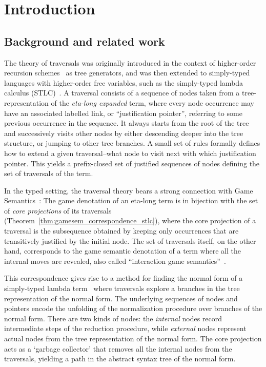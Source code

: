 \documentclass{elsarticle}
\theoremstyle{plain}
\theoremstyle{definition}
\theoremstyle{remark}
\begin{document}
\maketitle


\section{Introduction}

\subsection{Background and related work}
The theory of traversals was originally introduced in the context of higher-order recursion schemes~\cite{OngLics2006} as tree generators, and was
then extended to simply-typed languages with higher-order free variables, such as the simply-typed lambda calculus (STLC)~\cite{BlumPhd}. A traversal consists of a sequence of nodes taken from a tree-representation of the \emph{eta-long expanded} term, where every node occurrence may have an associated labelled link, or ``justification pointer'', referring to some previous occurrence in the sequence. It always starts from the root of the tree and successively visits other nodes by either descending deeper into the tree structure, or jumping to other tree branches. A small set of rules formally defines how to extend a given traversal--what node to visit next with which justification pointer. This yields a prefix-closed set of justified sequences of nodes defining the set of traversals of the term.

In the typed setting, the traversal theory bears a strong connection with Game Semantics~\cite{BlumPhd}: The game denotation of an eta-long term is in bijection with the set of \emph{core projections} of its traversals (Theorem~\ref{thm:gamesem_correspondence_stlc}), where the core projection of a traversal is the subsequence obtained by keeping only occurrences that are
transitively justified by the initial node.
The set of traversals itself, on the other hand, corresponds to the game semantic denotation of a term where all the internal moves are revealed, also called ``interaction game semantics''~\cite{BlumPhd}.

This correspondence gives rise to a method for finding the normal form of a simply-typed lambda term~\cite{BlumPhd,BlumGalop2008,Blum-LocalBeta2008}
where traversals explore a branches in the tree representation of the normal form. The underlying sequences of nodes and pointers encode the unfolding of the normalization procedure over branches of the normal form. There are two kinds of nodes: the \emph{internal} nodes record intermediate steps of the reduction procedure, while \emph{external} nodes represent actual nodes from the tree representation of the normal form. The core projection acts as a `garbage collector' that removes all the internal nodes from the traversals,  yielding a path in the abstract syntax tree of the normal form.
\end{document}
